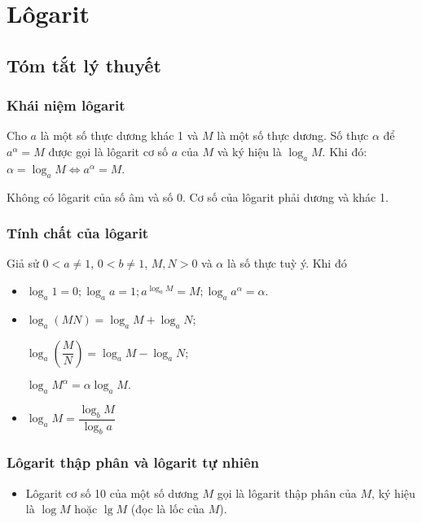 \section{Lôgarit}
\subsection{Tóm tắt lý thuyết}
\begin{tomtat}
\subsubsection{Khái niệm lôgarit}
Cho $a$ là một số thực dương khác 1 và $M$ là một số thực dương. Số thực $\alpha$ để $a^\alpha=M$ được gọi là lôgarit cơ số $a$ của $M$ và ký hiệu là $\log_aM$. Khi đó: $\alpha=\log_aM\iff a^\alpha=M$.

\begin{note}
Không có lôgarit của số âm và số 0. Cơ số của lôgarit phải dương và khác 1.
\end{note}
	
\subsubsection{Tính chất của lôgarit}
Giả sử $0<a\neq 1$, $0<b\neq 1$, $M,N>0$ và $\alpha$ là số thực tuỳ ý. Khi đó
\begin{itemize}
\item $\log_a1=0; \log_aa=1; a^{\log_aM}=M;\log_aa^\alpha=\alpha.$

\item $ \log_a(MN)=\log_aM+\log_aN;$

$\log_a\left(\dfrac{M}{N}\right)=\log_aM-\log_aN;$

$\log_aM^\alpha=\alpha\log_aM.$

\item $\log_aM=\dfrac{\log_bM}{\log_ba}$
\end{itemize}
\subsubsection{Lôgarit thập phân và lôgarit tự nhiên}
\begin{itemize}
\item Lôgarit cơ số 10 của một số dương $M$ gọi là lôgarit thập phân của $M$, ký hiệu là $\log M$ hoặc $\lg M$ (đọc là lốc của $M$).


\end{itemize}
\end{tomtat}
